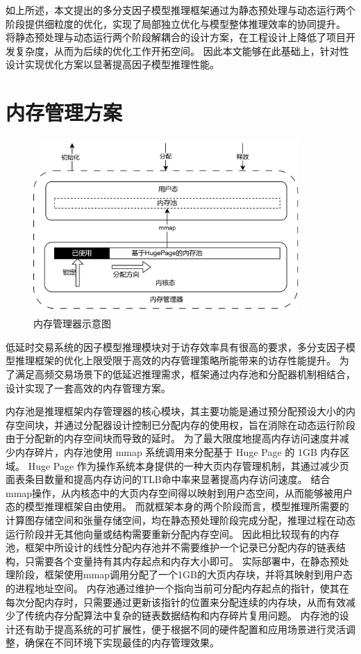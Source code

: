 如上所述，本文提出的多分支因子模型推理框架通过为静态预处理与动态运行两个阶段提供细粒度的优化，实现了局部独立优化与模型整体推理效率的协同提升。
将静态预处理与动态运行两个阶段解耦合的设计方案，在工程设计上降低了项目开发复杂度，从而为后续的优化工作开拓空间。
因此本文能够在此基础上，针对性设计实现优化方案以显著提高因子模型推理性能。

\section{内存管理方案}

\begin{figure}[h]
    \centering
    \includegraphics[width=0.9\textwidth]{image/chap03/memma.png}
    \caption{内存管理器示意图}
    \label{fig:memmory}
\end{figure}

低延时交易系统的因子模型推理模块对于访存效率具有很高的要求，多分支因子模型推理框架的优化上限受限于高效的内存管理策略所能带来的访存性能提升。
为了满足高频交易场景下的低延迟推理需求，框架通过内存池和分配器机制相结合，设计实现了一套高效的内存管理方案。

内存池是推理框架内存管理器的核心模块，其主要功能是通过预分配预设大小的内存空间块，并通过分配器设计控制已分配内存的使用权，旨在消除在动态运行阶段由于分配新的内存空间块而导致的延时。
为了最大限度地提高内存访问速度并减少内存碎片，内存池使用 mmap 系统调用来分配基于 Huge Page 的 1GB 内存区域。
Huge Page 作为操作系统本身提供的一种大页内存管理机制，其通过减少页面表条目数量和提高内存访问的TLB命中率来显著提高内存访问速度。
结合mmap操作，从内核态中的大页内存空间得以映射到用户态空间，从而能够被用户态的模型推理框架自由使用。
而就框架本身的两个阶段而言，模型推理所需要的计算图存储空间和张量存储空间，均在静态预处理阶段完成分配，推理过程在动态运行阶段并无其他向量或结构需要重新分配内存空间。
因此相比较现有的内存池，框架中所设计的线性分配内存池并不需要维护一个记录已分配内存的链表结构，只需要各个变量持有其内存起点和内存大小即可。
实际部署中，在静态预处理阶段，框架使用mmap调用分配了一个1GB的大页内存块，并将其映射到用户态的进程地址空间。
内存池通过维护一个指向当前可分配内存起点的指针，使其在每次分配内存时，只需要通过更新该指针的位置来分配连续的内存块，从而有效减少了传统内存分配算法中复杂的链表数据结构和内存碎片复用问题。
内存池的设计还有助于提高系统的可扩展性，便于根据不同的硬件配置和应用场景进行灵活调整，确保在不同环境下实现最佳的内存管理效果。

